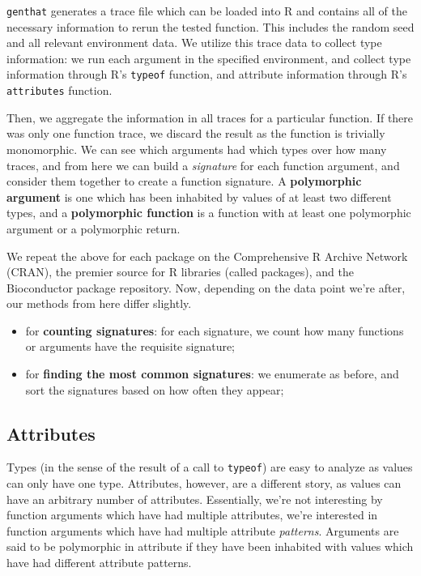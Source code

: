 \documentclass[acmsmall,10pt,review,anonymous]{acmart}\settopmatter{printfolios=true,printccs=false,printacmref=false}
\begin{document}
{\tt genthat} generates a trace file which can be loaded into R and contains
all of the necessary information to rerun the tested function.  This
includes the random seed and all relevant environment data.  We utilize this
trace data to collect type information: we run each argument in the
specified environment, and collect type information through R's {\tt typeof}
function, and attribute information through R's {\tt attributes} function.

Then, we aggregate the information in all traces for a particular function.
If there was only one function trace, we discard the result as the function
is trivially monomorphic.  We can see which arguments had which types over
how many traces, and from here we can build a \textit{signature} for each
function argument, and consider them together to create a function
signature.  A \textbf{polymorphic argument} is one which has been inhabited
by values of at least two different types, and a \textbf{polymorphic
  function} is a function with at least one polymorphic argument or a
polymorphic return.

We repeat the above for each package on the Comprehensive R Archive Network
(CRAN), the premier source for R libraries (called packages), and the
Bioconductor package repository.  Now, depending on the data point we're
after, our methods from here differ slightly.

\begin{itemize}
    \item for \textbf{counting signatures}: for each signature, we count how
      many functions or arguments have the requisite signature;
    \item for \textbf{finding the most common signatures}: we enumerate as before, and sort the signatures based on how often they appear;
\end{itemize}

%
%
%
%
\subsection{Attributes}
\label{sec:method:attributes}

Types (in the sense of the result of a call to {\tt typeof}) are easy to analyze as values can only have one type.
Attributes, however, are a different story, as values can have an arbitrary number of attributes.
Essentially, we're not interesting by function arguments which have had multiple attributes, we're interested in function arguments which have had multiple attribute \textit{patterns}. 
Arguments are said to be polymorphic in attribute if they have been inhabited with values which have had different attribute patterns.
\end{document}
